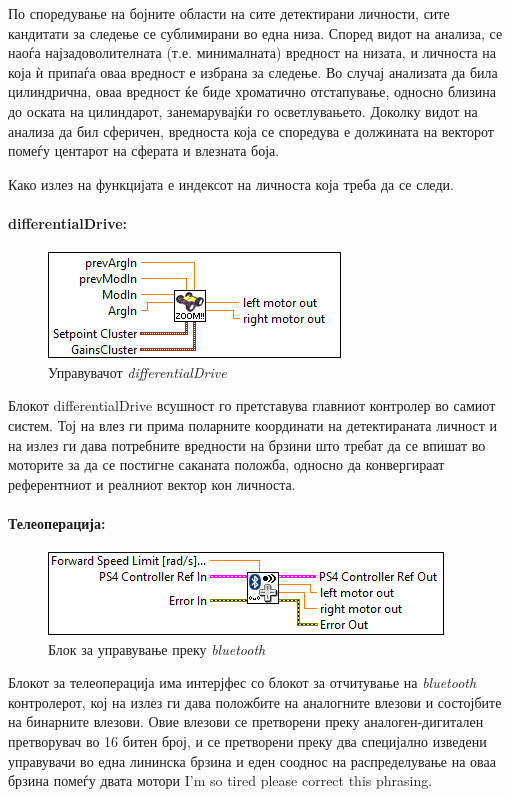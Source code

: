 \documentclass[12pt]{article}
\begin{document}
        По споредување на бојните области на сите детектирани личности, сите кандитати за следење се сублимирани во една низа. Според видот на анализа, се наоѓа најзадоволителната (т.е. минималната) вредност на низата, и личноста на која ѝ припаѓа оваа вредност е избрана за следење. Во случај анализата да била цилиндрична, оваа вредност ќе биде хроматично отстапување, односно близина до оската на цилиндарот, занемарувајќи го осветлувањето. Доколку видот на анализа да бил сферичен, вредноста која се споредува е должината на векторот помеѓу центарот на сферата и влезната боја.

        Како излез на функцијата е индексот на личноста која треба да се следи.

      \paragraph{differentialDrive:\\}
	\begin{figure}[H]
	    \includegraphics[width=0.55\linewidth]{./images/differential_drive_border.PNG}
		\caption{Управувачот \textit{differentialDrive}}
	    \label{fig:diffDrive}
	    \raggedright
	    \end{figure}
        Блокот differentialDrive всушност го претставува главниот контролер во самиот систем. Тој на влез ги прима поларните координати на детектираната личност и на излез ги дава потребните вредности на брзини што требат да се впишат во моторите за да се постигне саканата положба, односно да конвергираат референтниот и реалниот вектор кон личноста. %

    \paragraph{Телеоперација:\\}
	\begin{figure}[H]
	    \includegraphics[width=0.55\linewidth]{./images/teleop_tooltip_border.PNG}
		\caption{Блок за управување преку \textit{bluetooth}}
	    \label{fig:teleop}
	    \raggedright
	    \end{figure}
	Блокот за телеоперација има интерјфес со блокот за отчитување на \textit{bluetooth} контролерот, кој на излез ги дава положбите на аналогните влезови и состојбите на бинарните влезови. Овие влезови се претворени преку аналоген-дигитален претворувач во 16 битен број, и се претворени преку два специјално изведени управувачи во една лининска брзина и еден сооднос на распределување на оваа брзина помеѓу двата мотори I'm so tired please correct this phrasing. 
\end{document}
